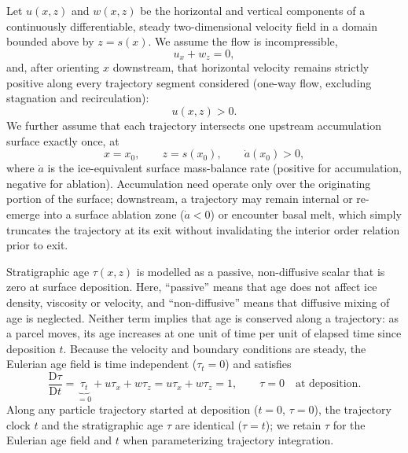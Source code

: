 \documentclass[review]{igs}
\begin{document}
Let \(u(x,z)\) and \(w(x,z)\) be the horizontal and vertical components of a continuously differentiable, steady two-dimensional velocity field in a domain bounded above by \(z=s(x)\). We assume the flow is incompressible,
\begin{equation}
u_x+w_z=0,
\label{eq:incompressibility}
\end{equation}
and, after orienting \(x\) downstream, that horizontal velocity remains strictly positive along every trajectory segment considered (one-way flow, excluding stagnation and recirculation):
\begin{equation}
u(x,z)>0.
\label{eq:forwardflow}
\end{equation}
We further assume that each trajectory intersects one upstream accumulation surface exactly once, at
\begin{equation}
x=x_0,
\qquad z=s(x_0),
\qquad \dot a(x_0)>0,
\label{eq:surfaceorigin}
\end{equation}
where \(\dot a\) is the ice-equivalent surface mass-balance rate (positive for accumulation, negative for ablation). Accumulation need operate only over the originating portion of the surface; downstream, a trajectory may remain internal or re-emerge into a surface ablation zone (\(\dot a<0\)) or encounter basal melt, which simply truncates the trajectory at its exit without invalidating the interior order relation prior to exit.

Stratigraphic age \(\tau(x,z)\) is modelled as a passive, non-diffusive scalar that is zero at surface deposition. Here, ``passive'' means that age does not affect ice density, viscosity or velocity, and ``non-diffusive'' means that diffusive mixing of age is neglected. Neither term implies that age is conserved along a trajectory: as a parcel moves, its age increases at one unit of time per unit of elapsed time since deposition \(t\). Because the velocity and boundary conditions are steady, the Eulerian age field is time independent (\(\tau_t=0\)) and satisfies
\begin{equation}
\frac{\mathrm{D}\tau}{\mathrm{D}t}
=\underbrace{\tau_t}_{=0}+u\tau_x+w\tau_z
=u\tau_x+w\tau_z
=1,
\qquad \tau=0\quad\text{at deposition}.
\label{eq:age}
\end{equation}
Along any particle trajectory started at deposition (\(t=0\), \(\tau=0\)), the trajectory clock \(t\) and the stratigraphic age \(\tau\) are identical (\(\tau=t\)); we retain \(\tau\) for the Eulerian age field and \(t\) when parameterizing trajectory integration.
\end{document}
